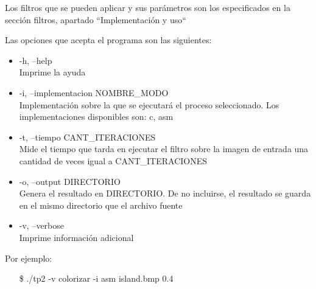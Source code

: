 \documentclass[a4paper, 12pt]{article}
\newcommand{\code}[1]{{\sffamily #1}\xspace}
\begin{document}
Los filtros que se pueden aplicar y sus parámetros son
los especificados en la sección filtros, apartado
``Implementación y uso``


Las opciones que acepta el programa son las siguientes:
\begin{itemize}
  \itemsep0em
  \item \code{-h, --help} \\
  \indent Imprime la ayuda

  \item \code{-i, --implementacion NOMBRE\_MODO} \\
  \indent Implementación sobre la que se ejecutará el proceso
    seleccionado. Los implementaciones disponibles son: c, asm

  \item \code{-t, --tiempo CANT\_ITERACIONES} \\
  \indent Mide el tiempo que tarda en ejecutar el filtro sobre la
    imagen de entrada una cantidad de veces igual a CANT\_ITERACIONES


  \item \code{-o, --output DIRECTORIO} \\
  \indent Genera el resultado en DIRECTORIO.
    De no incluirse, el resultado se guarda en el mismo directorio
    que el archivo fuente

  \item \code{-v, --verbose} \\
  \indent Imprime información adicional


\end{itemize}

\vspace*{0.3cm}
\noindent Por ejemplo:
\vspace*{-0.2cm}
\begin{itemize}
    \item [\code{\$}]
        \code{./tp2 -v colorizar -i asm island.bmp 0.4}
\end{itemize}
\end{document}
